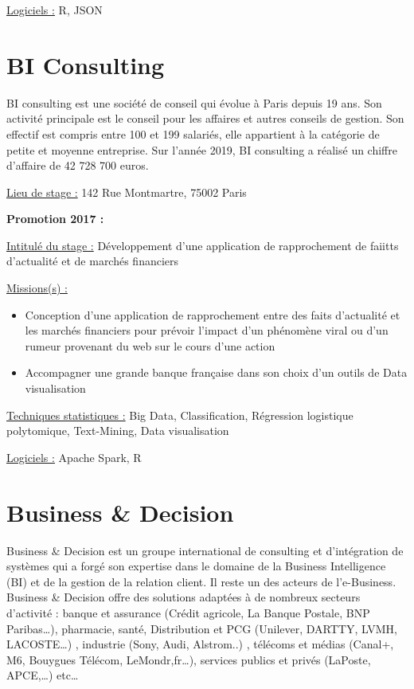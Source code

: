 \documentclass[
  letterpaper,
  DIV=11,
  numbers=noendperiod]{scrreprt}
\begin{document}
\uline{Logiciels :} R, JSON

\hypertarget{bi-consulting}{%
\section{\texorpdfstring{\textbf{BI
Consulting}}{BI Consulting}}\label{bi-consulting}}

BI consulting est une société de conseil qui évolue à Paris depuis 19
ans. Son activité principale est le conseil pour les affaires et autres
conseils de gestion. Son effectif est compris entre 100 et 199 salariés,
elle appartient à la catégorie de petite et moyenne entreprise. Sur
l'année 2019, BI consulting a réalisé un chiffre d'affaire de 42 728 700
euros.

\uline{Lieu de stage :} 142 Rue Montmartre, 75002 Paris

\textbf{Promotion 2017 :}

\uline{Intitulé du stage :} Développement d'une application de
rapprochement de faiitts d'actualité et de marchés financiers

\uline{Missions(s) :}

\begin{itemize}
\item
  Conception d'une application de rapprochement entre des faits
  d'actualité et les marchés financiers pour prévoir l'impact d'un
  phénomène viral ou d'un rumeur provenant du web sur le cours d'une
  action
\item
  Accompagner une grande banque française dans son choix d'un outils de
  Data visualisation
\end{itemize}

\uline{Techniques statistiques :} Big Data, Classification, Régression
logistique polytomique, Text-Mining, Data visualisation

\uline{Logiciels :} Apache Spark, R

\hypertarget{business-decision}{%
\section{\texorpdfstring{\textbf{Business \&
Decision}}{Business \& Decision}}\label{business-decision}}

Business \& Decision est un groupe international de consulting et
d'intégration de systèmes qui a forgé son expertise dans le domaine de
la Business Intelligence (BI) et de la gestion de la relation client. Il
reste un des acteurs de l'e-Business. Business \& Decision offre des
solutions adaptées à de nombreux secteurs d'activité : banque et
assurance (Crédit agricole, La Banque Postale, BNP Paribas\ldots),
pharmacie, santé, Distribution et PCG (Unilever, DARTTY, LVMH,
LACOSTE\ldots) , industrie (Sony, Audi, Alstrom..) , télécoms et médias
(Canal+, M6, Bouygues Télécom, LeMondr,fr\ldots), services publics et
privés (LaPoste, APCE,\ldots) etc\ldots{}
\end{document}
